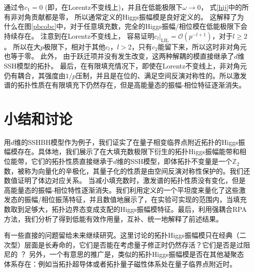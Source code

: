 通过令$c_1 = 0$ (即，在Lorentz不变线上)，并且在低能极限下$\omega \rightarrow 0$，
式\eqref{hij}中的所有非对角贡献都是零，
所以通常定义的Higgs振幅模是良好定义的。
这解释了为什么在图\ref{pbcobc}中，对于任意填充数，完全的Higgs振幅/相位模在低能极限下会持续存在。
注意到在Lorentz不变线上，
容易证明$c_l |_{\text{LIL}} =\mathcal{O} (p^{- l+ 1})$，对于$l \geq 2$。
所以在大$p$极限下，相对于其他$c_l$，$l>2$，只有$c_2$能留下来，所以这时非对角元也等于零。
此外，
由于跃迁项并没有发生改变，这两种解耦的模直接继承了$d$维SSH模型的拓扑。
最后，在有限填充情况下，即使在Lorentz不变线上，非对角元仍有耦合，其强度由$1/p$压制，并且是在位的、满足空间反演对称性的。所以激发谱的拓扑性质在有限填充下仍然存在，但是高能量态的振幅-相位特征逐渐消失。

\section{小结和讨论}

用$d$维的SSHBH模型作为例子，我们证实了在量子相变临界点附近拓扑的Higgs振幅模存在。具体地，我们展示了在大填充数极限下衍生的拓扑Higgs振幅能带和相位能带，它们的拓扑性质直接继承于$d$维的SSH模型，即体拓扑不变量是一个$\mathbb Z_2$数，被称为向量化的辛极化，其量子化的性质是由空间反演对称性保护的。我们还数值证明了体边对应关系。
当减小填充数时，激发谱的拓扑性质没有变化，但是高能量态的振幅-相位特性逐渐消失。我们利用定义的一个平坦度来量化了这些激发态的振幅/相位振荡特征，并且数值地展示了，在实验可实现的范围内，当填充数取到足够大，拓扑边界态变成支配的Higgs振幅模特征。最后，利用强耦合RPA方法，我们分析了得到低能有效作用量，互补、统一地解释了前述结果。

有一些直接的问题留给未来继续研究。这里讨论的拓扑Higgs振幅模只在经典（二次型）层面是长寿命的，它们是否能在考虑量子修正时仍然存活？它们是否是过阻尼的 \cite{Podolsky2011}？
另外，一个有意思的推广是，类似的拓扑Higgs振幅模是否在其他凝聚态体系存在：例如当拓扑超导体或者拓扑量子磁性体系处在量子临界点附近时。
